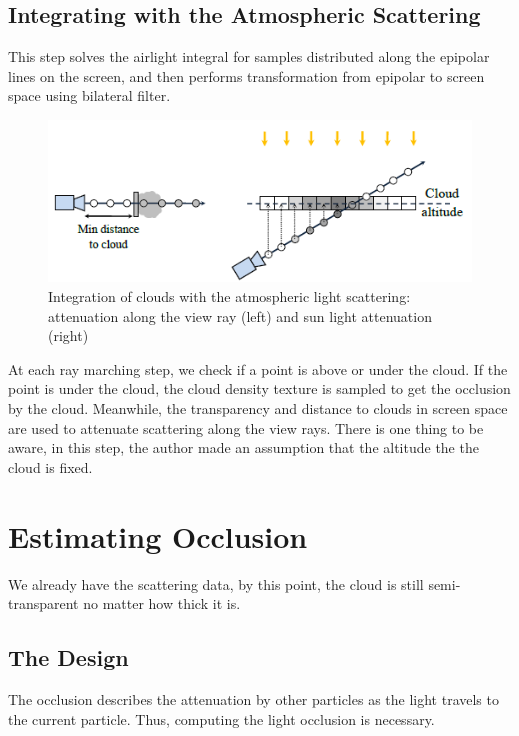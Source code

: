 \subsection{Integrating with the Atmospheric Scattering}
This step solves the airlight integral for samples distributed along the epipolar lines on the screen, and then performs transformation from epipolar to screen space using bilateral filter.

\begin{figure}[htp]
\begin{center}
\includegraphics[scale=0.8]{images/integration.png}
\caption{Integration of clouds with the atmospheric light
scattering: attenuation along the view ray (left) and sun light
attenuation (right)}
\label{f17}
\end{center}
\end{figure}

At each ray marching step, we check if a point is above or under the cloud. If the point is under the cloud, the cloud density texture is sampled to get the occlusion by the cloud. Meanwhile, the transparency and distance to clouds in screen space are used to attenuate scattering along the view rays. There is one thing to be aware, in this step, the author made an assumption that the altitude the the cloud is fixed.

\section{Estimating Occlusion}
We already have the scattering data, by this point, the cloud is still semi-transparent no matter how thick it is. 
\subsection{The Design}
The occlusion describes the attenuation by other particles as the light travels to the current particle. Thus, computing the light occlusion is necessary.

